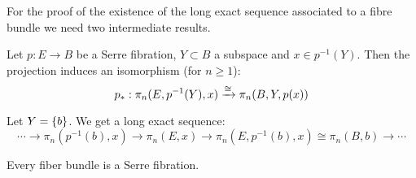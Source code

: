 For the proof of the existence of the long exact sequence associated to a fibre bundle we need two intermediate results.

\begin{proposition**}
Let $p:E\to B$ be a Serre fibration, $Y\subset B$ a subspace and $x\in p^{-1}(Y)$. Then the projection induces an isomorphism (for $n\geq 1$):
\[p_*:\pi_n(E,p^{-1}(Y),x)\xrightarrow{\cong}\pi_n(B,Y,p(x))\]
\end{proposition**}

\begin{corollary**}
Let $Y=\{b\}$. We get a long exact sequence:
\[\cdots\to\pi_n(p^{-1}(b),x)\to\pi_n(E,x)\to\pi_n(E,p^{-1}(b),x)\cong\pi_n(B,b)\to\cdots\]
\end{corollary**}

\begin{theorem**}
Every fiber bundle is a Serre fibration.
\end{theorem**}
